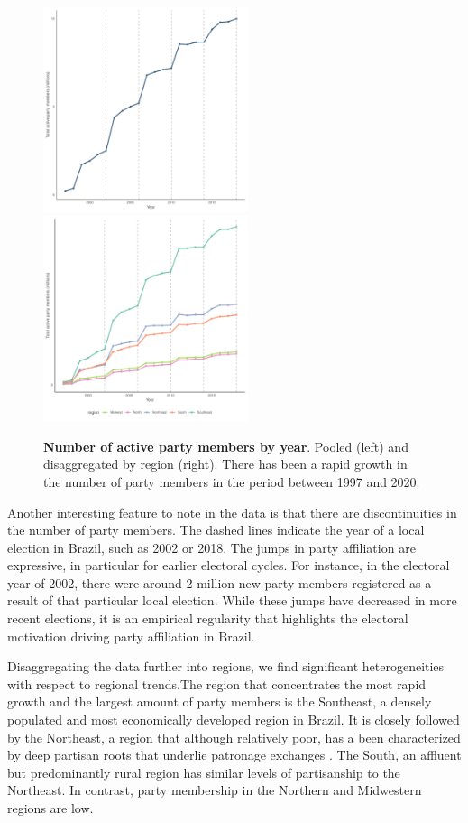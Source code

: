 \begin{figure}[H]
    \centering
    \includegraphics[width = 6cm, height = 6cm]{chapters/chapter_3/figures/partisanship/plot_partisan_by_year.pdf}
    \includegraphics[width = 6cm, height = 6cm]{chapters/chapter_3/figures/partisanship/plot_partisan_by_region.pdf}
    \caption{\textbf{Number of active party members by year}. Pooled (left) and disaggregated by region (right). There has been a rapid growth in the number of party members in the period between 1997 and 2020.}
    \label{fig:number_partisan}
\end{figure}

Another interesting feature to note in the data is that there are discontinuities in the number of party members. The dashed lines indicate the year of a local election in Brazil, such as 2002 or 2018. The jumps in party affiliation are expressive, in particular for earlier electoral cycles. For instance, in the electoral year of 2002, there were around 2 million new party members registered as a result of that particular local election. While these jumps have decreased in more recent elections, it is an empirical regularity that highlights the electoral motivation driving party affiliation in Brazil.

Disaggregating the data further into regions, we find significant heterogeneities with respect to regional trends.The region that concentrates the most rapid growth and the largest amount of party members is the Southeast, a densely populated and most economically developed region in Brazil. It is closely followed by the Northeast, a region that although relatively poor, has a been characterized by deep partisan roots that underlie patronage exchanges \citep{ansell2010auctioning}. The South, an affluent but predominantly rural region has similar levels of partisanship to the Northeast. In contrast, party membership in the Northern and Midwestern regions are low.

